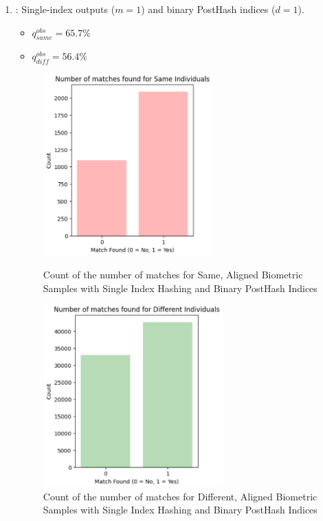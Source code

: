 \begin{enumerate}
    \item {}: Single-index outputs (\(m=1\)) and binary PostHash indices (\(d=1\)).
    \begin{itemize}
        \item \(q_{same}^{obs} = 65.7\%\)
        \item \(q_{diff}^{obs} = 56.4\%\)
    \end{itemize}

    \begin{figure}[H]
        \centering
        \begin{minipage}[b]{0.48\linewidth}
            \centering
            \includegraphics[width=\linewidth,height=7cm,keepaspectratio]{latex-img/d1same.png}
            \caption{Count of the number of matches for Same, Aligned Biometric Samples with Single Index Hashing and Binary PostHash Indices}
            \label{mu_same}
        \end{minipage}
        \hfill
        \begin{minipage}[b]{0.48\linewidth}
            \centering
            \includegraphics[width=\linewidth,height=7cm,keepaspectratio]{latex-img/d1diff.png}
            \caption{Count of the number of matches for Different, Aligned Biometric Samples with Single Index Hashing and Binary PostHash Indices}
            \label{mu_diff}
        \end{minipage}
    \end{figure}
    

\end{enumerate}
